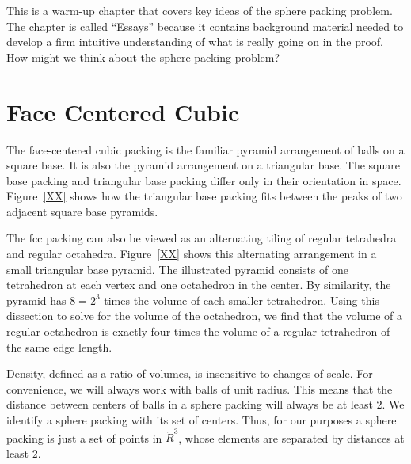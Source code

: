 
This is a warm-up chapter that covers key ideas of the sphere packing problem.
The chapter is called ``Essays'' because it contains background material
needed to develop a firm intuitive understanding of what is really going on in the proof.   How might we think about the sphere packing problem?  


\section{Face Centered Cubic}





The face-centered cubic packing is the familiar pyramid arrangement
of balls on a square base.  It is also the pyramid arrangement on 
a triangular base.  The square base packing and triangular base
packing differ only in their orientation in space.  
Figure~\ref{XX} %
shows how the triangular base packing fits between the peaks
of two adjacent square base pyramids.

\bigskip

The fcc packing can also be viewed as an alternating tiling of regular
tetrahedra and regular octahedra.  Figure~\ref{XX} shows this alternating
arrangement in a small triangular base pyramid.  
The illustrated pyramid consists of one
tetrahedron at each vertex and one octahedron in the center.
By similarity, the pyramid has $8 = 2^3$ times the volume of each
smaller tetrahedron.
Using this dissection to solve for the volume of the octahedron, we find that
the volume of a regular octahedron is exactly four times
the volume of a regular tetrahedron of the same edge length.

Density, defined as a ratio of volumes, is insensitive to changes
of scale.  For convenience, we will always work with balls of unit radius.
This means that the distance between centers of balls in a sphere packing
will always be at least $2$.  We identify a sphere packing with
its set of centers.  Thus, for our purposes a sphere packing is just
a set of points in $\ring{R}^3$, whose elements are separated by
distances at least $2$.




